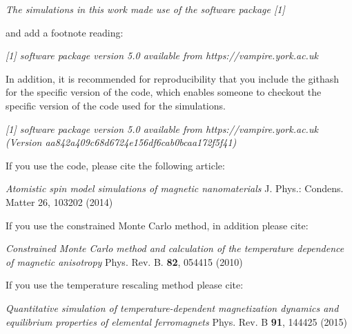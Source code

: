 \indent \textit{The simulations in this work made use of the \vampire software package [1]}

\noindent and add a footnote reading:

\indent \textit{[1] \vampire software package version 5.0 available from https://vampire.york.ac.uk}

\noindent In addition, it is recommended for reproducibility that you include the githash for the specific version of the code, which enables someone to checkout the specific version of the code used for the simulations. 

\indent \textit{[1] \vampire software package version 5.0 available from https://vampire.york.ac.uk (Version aa842a409c68d6724e156df6cab0bcaa172f5f41)}

\noindent If you use the code, please cite the following article:

\noindent \textit{\small Atomistic spin model simulations of magnetic nanomaterials} \newline
{} \newline
{\small J. Phys.: Condens. Matter 26, 103202 (2014)}

\noindent If you use the constrained Monte Carlo method, in addition please cite:

\noindent \textit{\small Constrained Monte Carlo method and calculation of the temperature dependence of magnetic anisotropy}\newline
{} \newline
{\small Phys. Rev. B. \textbf{82}, 054415 (2010)}

\noindent If you use the temperature rescaling method please cite:

\noindent \textit{\small Quantitative simulation of temperature-dependent magnetization dynamics and equilibrium properties of elemental ferromagnets} \newline
{} \newline
{\small Phys. Rev. B \textbf{91}, 144425 (2015)}

